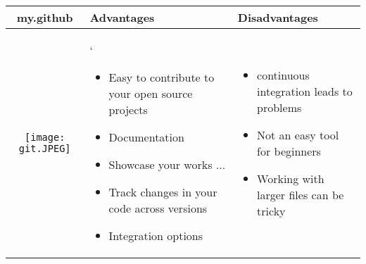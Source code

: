 \documentclass{article}
\begin{document}
	
\begin{table}
	\centering
	\begin{tabular}{  | c | m{5cm} | m{5cm} | }
		\hline
		my.github & Advantages & Disadvantages \\
		\hline
		\begin{minipage}{.4\textwidth}
			\texttt{[image: git.JPEG]}
		\end{minipage}
	&
	`\begin{itemize}
		\item Easy to contribute to your open source projects
		\item Documentation
		\item Showcase your works $\ldots$
		\item Track changes in your code across versions
		\item Integration options
	\end{itemize}
	&
	 \begin{itemize}
	 	\item continuous integration leads to problems
	 	\item Not an easy tool for beginners
	 	\item Working with larger files can be tricky
	\end{itemize}
\\
	 	\hline
	\end{tabular}
\end{table}
\end{document}
